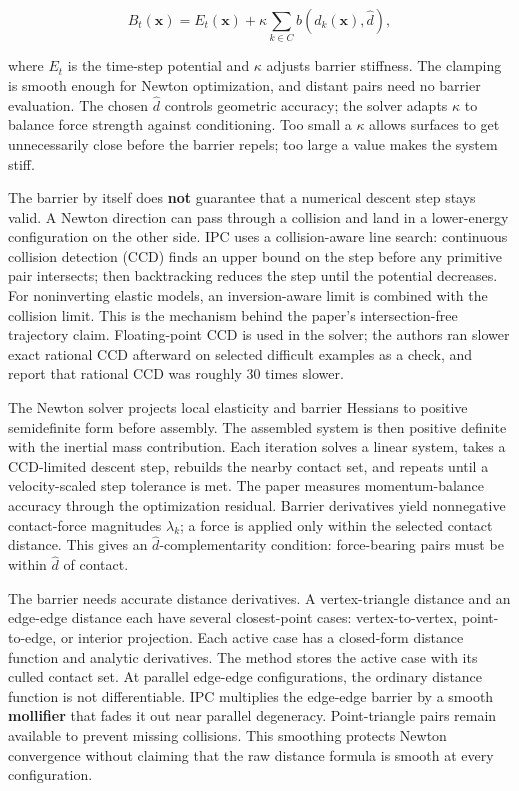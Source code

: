 \[B_t(\mathbf{x})=E_t(\mathbf{x})+\kappa\sum_{k\in C}b(d_k(\mathbf{x}),\widehat d),\]

where \(E_t\) is the time-step potential and \(\kappa\) adjusts barrier stiffness. The clamping is smooth enough for Newton optimization, and distant pairs need no barrier evaluation. The chosen \(\widehat d\) controls geometric accuracy; the solver adapts \(\kappa\) to balance force strength against conditioning. Too small a \(\kappa\) allows surfaces to get unnecessarily close before the barrier repels; too large a value makes the system stiff.

The barrier by itself does \textbf{not} guarantee that a numerical descent step stays valid. A Newton direction can pass through a collision and land in a lower-energy configuration on the other side. IPC uses a collision-aware line search: continuous collision detection (CCD) finds an upper bound on the step before any primitive pair intersects; then backtracking reduces the step until the potential decreases. For noninverting elastic models, an inversion-aware limit is combined with the collision limit. This is the mechanism behind the paper's intersection-free trajectory claim. Floating-point CCD is used in the solver; the authors ran slower exact rational CCD afterward on selected difficult examples as a check, and report that rational CCD was roughly 30 times slower.

The Newton solver projects local elasticity and barrier Hessians to positive semidefinite form before assembly. The assembled system is then positive definite with the inertial mass contribution. Each iteration solves a linear system, takes a CCD-limited descent step, rebuilds the nearby contact set, and repeats until a velocity-scaled step tolerance is met. The paper measures momentum-balance accuracy through the optimization residual. Barrier derivatives yield nonnegative contact-force magnitudes \(\lambda_k\); a force is applied only within the selected contact distance. This gives an \(\widehat d\)-complementarity condition: force-bearing pairs must be within \(\widehat d\) of contact.

The barrier needs accurate distance derivatives. A vertex-triangle distance and an edge-edge distance each have several closest-point cases: vertex-to-vertex, point-to-edge, or interior projection. Each active case has a closed-form distance function and analytic derivatives. The method stores the active case with its culled contact set. At parallel edge-edge configurations, the ordinary distance function is not differentiable. IPC multiplies the edge-edge barrier by a smooth \textbf{mollifier} that fades it out near parallel degeneracy. Point-triangle pairs remain available to prevent missing collisions. This smoothing protects Newton convergence without claiming that the raw distance formula is smooth at every configuration.

